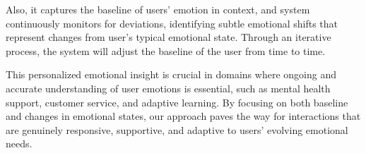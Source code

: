 \par Also, it captures the baseline of users' emotion in context, and system continuously monitors for deviations, identifying subtle emotional shifts that represent changes from user's typical emotional state. Through an iterative process, the system will adjust the baseline of the user from time to time.

\par This personalized emotional insight is crucial in domains where ongoing and accurate understanding of user emotions is essential, such as mental health support, customer service, and adaptive learning. By focusing on both baseline and changes in emotional states, our approach paves the way for interactions that are genuinely responsive, supportive, and adaptive to users' evolving emotional needs.